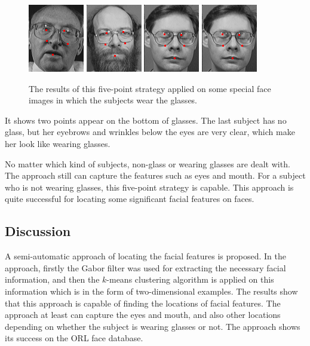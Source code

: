 \begin{figure}[ht]
\begin{center}
  \includegraphics[width=0.15\columnwidth]{ch3/figures/badglass7.png}
  \includegraphics[width=0.15\columnwidth]{ch3/figures/badglass8.png}
  \includegraphics[width=0.15\columnwidth]{ch3/figures/badglass9.png}
  \includegraphics[width=0.15\columnwidth]{ch3/figures/badglass10.png}
\caption{The results of this five-point strategy applied on some special face images in which the subjects wear the glasses.}
\label{fig:withglasses}
 \end{center}
\end{figure} 
It shows two points appear on the bottom of glasses. The last subject has no glass, but her eyebrows and wrinkles below the eyes are very clear, which make her look like wearing glasses. 

No matter which kind of subjects, non-glass or wearing glasses are dealt with. The approach still can capture the features such as eyes and mouth. For a subject who is not wearing glasses, this five-point strategy is capable. This approach is quite successful for locating some significant facial features on faces. 
\subsection{Discussion}
A semi-automatic approach of locating the facial features is proposed. In the approach, firstly the Gabor filter was used for extracting the necessary facial information, and then the $k$-means clustering algorithm is applied on this information which is in the form of two-dimensional examples. The results show that this approach is capable of finding the locations of facial features. The approach at least can capture the eyes and mouth, and also other locations depending on whether the subject is wearing glasses or not. The approach shows its success on the ORL face database.

